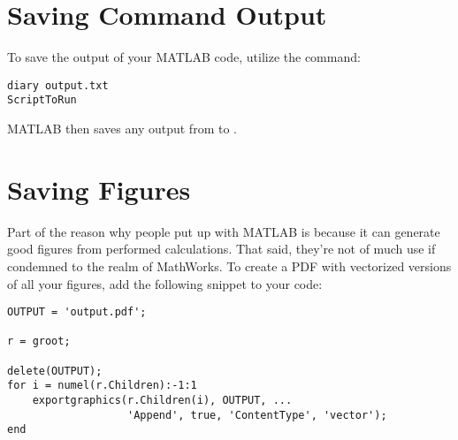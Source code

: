\documentclass{article}
\begin{document}
\section{Saving Command Output}

To save the output of your MATLAB code, utilize the  command:

\begin{verbatim}
diary output.txt
ScriptToRun
\end{verbatim}

MATLAB then saves any output from  to
.

\section{Saving Figures}

Part of the reason why people put up with MATLAB is because it can
generate good figures from performed calculations.  That said, they're
not of much use if condemned to the realm of MathWorks.  To create a PDF
with vectorized versions of all your figures, add the following snippet
to your code:

\begin{verbatim}
OUTPUT = 'output.pdf';

r = groot;

delete(OUTPUT);
for i = numel(r.Children):-1:1
    exportgraphics(r.Children(i), OUTPUT, ...
                   'Append', true, 'ContentType', 'vector');
end
\end{verbatim}
\end{document}
